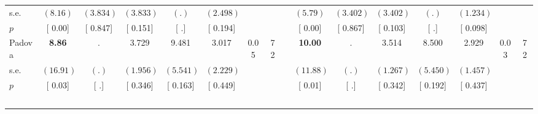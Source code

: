 \begin{longtable}{L{8em} c c c c c c c p{1em} c c c c c c c}
\quad \quad \quad \quad s.e.& $ (     8.16)$ & $ (    3.834)$ & $ (    3.833)$ & $ (        .)$ & $ (    2.498)$ & & & & $ (     5.79)$ & $ (    3.402)$ & $ (    3.402)$ & $ (        .)$ & $ (    1.234)$ & &  \\*
\quad \quad \quad \quad $ p$ & [     0.00] & [    0.847] & [    0.151] & [        .] & [    0.194] & & & & [     0.00] & [    0.867] & [    0.103] & [        .] & [    0.098] & &  \\[1em]
\quad \quad \quad Padova& \textbf{     8.86} &         . &     3.729 &     9.481 &     3.017 &      0.05 &        72 & & \textbf{    10.00} &         . &     3.514 &     8.500 &     2.929 &      0.03 &        72  \\*
\quad \quad \quad \quad s.e.& $ (    16.91)$ & $ (        .)$ & $ (    1.956)$ & $ (    5.541)$ & $ (    2.229)$ & & & & $ (    11.88)$ & $ (        .)$ & $ (    1.267)$ & $ (    5.450)$ & $ (    1.457)$ & &  \\*
\quad \quad \quad \quad $ p$ & [     0.03] & [        .] & [    0.346] & [    0.163] & [    0.449] & & & & [     0.01] & [        .] & [    0.342] & [    0.192] & [    0.437] & &  \\[1em]
~\\[1em]
\end{longtable}